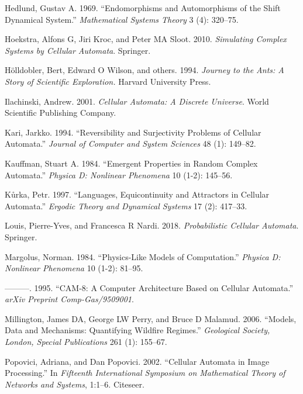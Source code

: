 \documentclass[
]{book}
\newlength{\cslhangindent}
\newenvironment{cslreferences}%
  {\setlength{\parindent}{0pt}%
  \everypar{\setlength{\hangindent}{\cslhangindent}}\ignorespaces}%
  {\par}
\begin{document}
\begin{cslreferences}
\leavevmode\hypertarget{ref-hedlund1969endomorphisms}{}%
Hedlund, Gustav A. 1969. ``Endomorphisms and Automorphisms of the Shift Dynamical System.'' \emph{Mathematical Systems Theory} 3 (4): 320--75.

\leavevmode\hypertarget{ref-hoekstra2010simulating}{}%
Hoekstra, Alfons G, Jiri Kroc, and Peter MA Sloot. 2010. \emph{Simulating Complex Systems by Cellular Automata}. Springer.

\leavevmode\hypertarget{ref-holldobler1994journey}{}%
Hölldobler, Bert, Edward O Wilson, and others. 1994. \emph{Journey to the Ants: A Story of Scientific Exploration.} Harvard University Press.

\leavevmode\hypertarget{ref-ilachinski2001cellular}{}%
Ilachinski, Andrew. 2001. \emph{Cellular Automata: A Discrete Universe}. World Scientific Publishing Company.

\leavevmode\hypertarget{ref-kari1994reversibility}{}%
Kari, Jarkko. 1994. ``Reversibility and Surjectivity Problems of Cellular Automata.'' \emph{Journal of Computer and System Sciences} 48 (1): 149--82.

\leavevmode\hypertarget{ref-kauffman1984emergent}{}%
Kauffman, Stuart A. 1984. ``Emergent Properties in Random Complex Automata.'' \emph{Physica D: Nonlinear Phenomena} 10 (1-2): 145--56.

\leavevmode\hypertarget{ref-kuurka1997languages}{}%
Kůrka, Petr. 1997. ``Languages, Equicontinuity and Attractors in Cellular Automata.'' \emph{Ergodic Theory and Dynamical Systems} 17 (2): 417--33.

\leavevmode\hypertarget{ref-louis2018probabilistic}{}%
Louis, Pierre-Yves, and Francesca R Nardi. 2018. \emph{Probabilistic Cellular Automata}. Springer.

\leavevmode\hypertarget{ref-margolus1984physics}{}%
Margolus, Norman. 1984. ``Physics-Like Models of Computation.'' \emph{Physica D: Nonlinear Phenomena} 10 (1-2): 81--95.

\leavevmode\hypertarget{ref-margolus1995cam}{}%
---------. 1995. ``CAM-8: A Computer Architecture Based on Cellular Automata.'' \emph{arXiv Preprint Comp-Gas/9509001}.

\leavevmode\hypertarget{ref-millington2006models}{}%
Millington, James DA, George LW Perry, and Bruce D Malamud. 2006. ``Models, Data and Mechanisms: Quantifying Wildfire Regimes.'' \emph{Geological Society, London, Special Publications} 261 (1): 155--67.

\leavevmode\hypertarget{ref-popovici2002cellular}{}%
Popovici, Adriana, and Dan Popovici. 2002. ``Cellular Automata in Image Processing.'' In \emph{Fifteenth International Symposium on Mathematical Theory of Networks and Systems}, 1:1--6. Citeseer.


\end{cslreferences}
\end{document}
